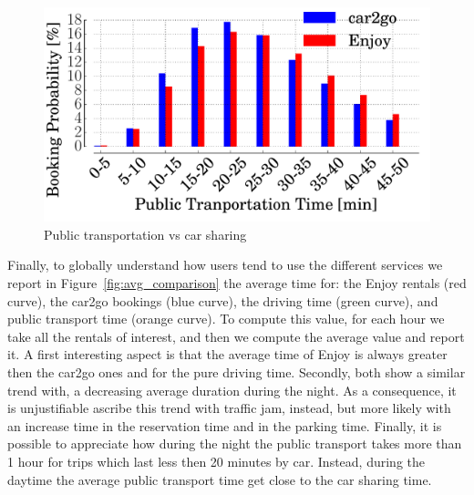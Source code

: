 \begin{figure}[h!]
	\centering
	\includegraphics[width=0.85\columnwidth]{figures/public_tranport_probability.pdf}
	\caption{Public transportation vs car sharing\label{fig:3_5_public_tranport_probabilityt}}
\end{figure}
  
%  
  
 
Finally, to globally understand how users tend to use the different services we report in Figure~\ref{fig:avg_comparison} the average time for: the Enjoy rentals (red curve), the car2go bookings (blue curve), the driving time (green curve), and public transport time (orange curve). To compute this value, for each hour we take all the rentals of interest, and then we compute the average value and report it. A first interesting aspect is that the average time of Enjoy is always greater then the car2go ones and for the pure driving time. Secondly, both show a similar trend with, a decreasing average duration during the night. As a consequence, it is unjustifiable ascribe this trend with traffic jam, instead, but more likely with an increase time in the reservation time and in the parking time. Finally, it is possible to appreciate how during the night the public transport takes more than 1 hour for trips which last less then 20 minutes by car. Instead, during the daytime the average public transport time get close to the car sharing time. 



